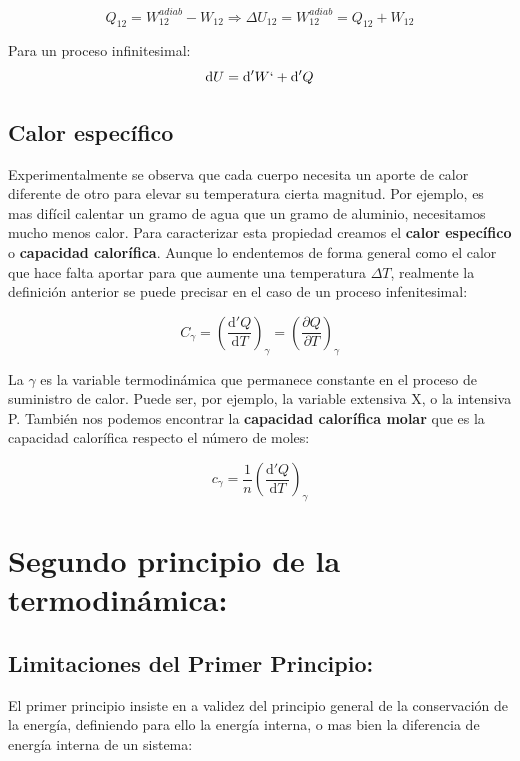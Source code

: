 \documentclass[12pt,a4paper]{article}
\newcommand{\D}{\mathrm{d}}
\newcommand{\parentesis}[1]{\left( #1 \right)}
\begin{document}
\begin{equation}
Q_{12} = W_{12}^{adiab} - W_{12} \Longrightarrow \Delta U_{12}=W_{12}^{adiab}=Q_{12}+W_{12} 
\end{equation}

Para un proceso infinitesimal: $$ \D U = \D ' W `+ \D ' Q $$


\subsection{Calor específico}

Experimentalmente se observa que cada cuerpo necesita un aporte de calor diferente de otro para elevar su temperatura cierta magnitud. Por ejemplo, es mas difícil calentar un gramo de agua que un gramo de aluminio, necesitamos mucho menos calor. Para caracterizar esta propiedad creamos el \textbf{calor específico} o \textbf{capacidad calorífica}. Aunque lo endentemos de forma general como el calor que hace falta aportar para que aumente una temperatura $\Delta T$, realmente la definición anterior se puede precisar en el caso de un proceso infenitesimal: 

\begin{equation}
C_{\gamma} = \parentesis{\dfrac{\D ' Q}{\D T}}_{\gamma} = \parentesis{\dfrac{\partial Q}{\partial T}}_{\gamma}
\end{equation}

La $\gamma$ es la variable termodinámica que permanece constante en el proceso de suministro de calor. Puede ser, por ejemplo, la variable extensiva X, o la intensiva P. También nos podemos encontrar la \textbf{capacidad calorífica molar} que es la capacidad calorífica respecto el número de moles: 

\begin{equation}
c_{\gamma} = \dfrac{1}{n} \parentesis{\dfrac{\D ' Q}{\D T}}_{\gamma}
\end{equation}

\newpage
\section{Segundo principio de la termodinámica:}
\subsection{Limitaciones del Primer Principio:}
El primer principio insiste en a validez del principio general de la conservación de la energía, definiendo para ello la energía interna, o mas bien la diferencia de energía interna de un sistema: 
\end{document}
